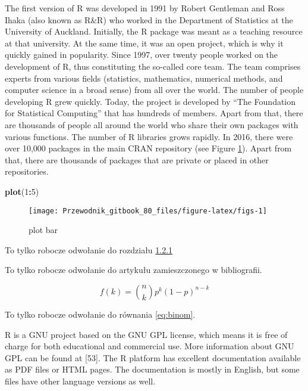 \documentclass[]{book}
\newenvironment{Shaded}{\begin{snugshade}}{\end{snugshade}}
\newcommand{\KeywordTok}[1]{\textcolor[rgb]{0.13,0.29,0.53}{\textbf{#1}}}
\newcommand{\DecValTok}[1]{\textcolor[rgb]{0.00,0.00,0.81}{#1}}
\newcommand{\OperatorTok}[1]{\textcolor[rgb]{0.81,0.36,0.00}{\textbf{#1}}}
\newcommand{\NormalTok}[1]{#1}
\theoremstyle{definition}
\theoremstyle{definition}
\theoremstyle{definition}
\theoremstyle{remark}
\begin{document}
The first version of R was developed in 1991 by Robert Gentleman and
Ross Ihaka (also known as R\&R) who worked in the Department of
Statistics at the University of Auckland. Initially, the R package was
meant as a teaching resource at that university. At the same time, it
was an open project, which is why it quickly gained in popularity. Since
1997, over twenty people worked on the development of R, thus
constituting the so-called core team. The team comprises experts from
various fields (statistics, mathematics, numerical methods, and computer
science in a broad sense) from all over the world. The number of people
developing R grew quickly. Today, the project is developed by ``The
Foundation for Statistical Computing'' that has hundreds of members.
Apart from that, there are thousands of people all around the world who
share their own packages with various functions. The number of R
libraries grows rapidly. In 2016, there were over 10,000 packages in the
main CRAN repository (see Figure \ref{fig:figs}). Apart from that, there
are thousands of packages that are private or placed in other
repositories.

\begin{Shaded}
\begin{Highlighting}[]
\KeywordTok{plot}\NormalTok{(}\DecValTok{1}\OperatorTok{:}\DecValTok{5}\NormalTok{)}
\end{Highlighting}
\end{Shaded}

\begin{figure}

{\centering \texttt{[image: Przewodnik\_gitbook\_80\_files/figure-latex/figs-1]} 

}

\caption{plot bar}\label{fig:figs}
\end{figure}

To tylko robocze odwołanie do rozdziału
\protect\hyperlink{part_121}{1.2.1}

To tylko robocze odwołanie do artykułu \citep{hs1986} zamieszczonego w
bibliografii.

\begin{equation}
f\left(k\right)=\binom{n}{k}p^k\left(1-p\right)^{n-k}
\label{eq:binom}
\end{equation}

To tylko robocze odwołanie do równania \eqref{eq:binom}.

R is a GNU project based on the GNU GPL license, which means it is free
of charge for both educational and commercial use. More information
about GNU GPL can be found at {[}53{]}. The R platform has excellent
documentation available as PDF files or HTML pages. The documentation is
mostly in English, but some files have other language versions as well.
\end{document}
